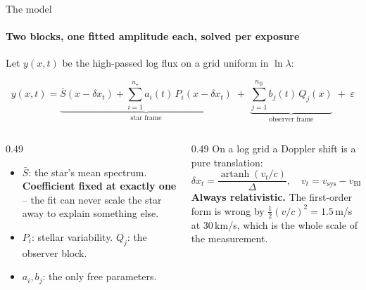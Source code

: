 \documentclass[aspectratio=169,11pt]{beamer}
\newcommand{\berv}{\mathrm{BERV}}
\begin{document}
\begin{frame}{The model}
  \framesubtitle{Two blocks, one fitted amplitude each, solved per exposure}

  Let $y(x,t)$ be the high-passed log flux on a grid uniform in $\ln\lambda$:

  \begin{equation*}
    y(x,t) =
    \underbrace{\bar{S}(x-\delta x_t) + \sum_{i=1}^{n_\star} a_i(t)\,P_i(x-\delta x_t)}_{\textstyle\text{star frame}}
    \;+\;
    \underbrace{\sum_{j=1}^{n_\oplus} b_j(t)\,Q_j(x)}_{\textstyle\text{observer frame}}
    \;+\;\varepsilon
  \end{equation*}

  \vspace{0.3em}
  \begin{columns}[T]
    \begin{column}{0.49\textwidth}\small
      \begin{itemize}
        \item $\bar{S}$: the star's mean spectrum. \textbf{Coefficient fixed
          at exactly one} -- the fit can never scale the star away to explain
          something else.
        \item $P_i$: stellar variability. $Q_j$: the observer block.
        \item $a_i, b_j$: the only free parameters.
      \end{itemize}
    \end{column}
    \begin{column}{0.49\textwidth}\small
      On a log grid a Doppler shift is a pure translation:
      \begin{equation*}
        \delta x_t = \frac{\operatorname{artanh}(v_t/c)}{\Delta},
        \quad v_t = v_{\mathrm{sys}} - v_{\berv}(t)
      \end{equation*}
      \textbf{Always relativistic.} The first-order form is wrong by
      $\tfrac12 (v/c)^2 = 1.5$\,m/s at 30\,km/s, which is the whole scale of
      the measurement.
    \end{column}
  \end{columns}
\end{frame}
\end{document}
